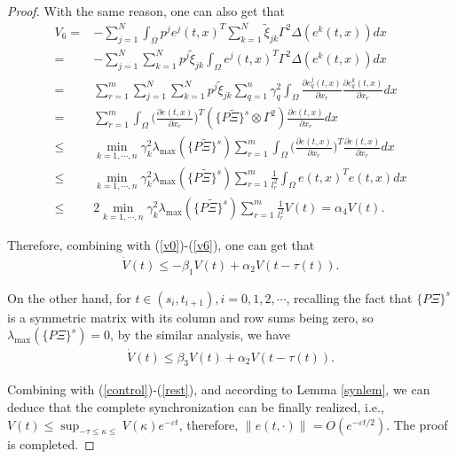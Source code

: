 \documentclass[review]{elsarticle}
\begin{document}
\begin{proof}
With the same reason, one can also get that
\begin{align}\label{v6}
V_6=&-\sum\limits_{j=1}^N\int_{\Omega}p^je^j(t,x)^T\sum\limits_{k=1}^N\tilde{\xi}_{jk}\Gamma^2
\Delta(e^k(t,x))dx\nonumber\\
=&-\sum\limits_{j=1}^N\sum\limits_{k=1}^Np^j\tilde{\xi}_{jk}\int_{\Omega}e^j(t,x)^T\Gamma^2
\Delta(e^k(t,x))dx\nonumber\\
=&\sum_{r=1}^m\sum\limits_{j=1}^N\sum\limits_{k=1}^Np^j\tilde{\xi}_{jk}\sum_{q=1}^n\gamma^2_{q}\int_{\Omega}\frac{\partial{e^j_q(t,x)}}{\partial{x_r}}
\frac{\partial{e^k_q(t,x)}}{\partial{x_r}}dx\nonumber\\
=&\sum_{r=1}^m\int_{\Omega}\bigg(\frac{\partial{e(t,x)}}{\partial{x_r}}\bigg)^T
(\{P\tilde{\Xi}\}^s\otimes \Gamma^2)\frac{\partial{e(t,x)}}{\partial{x_r}}dx\nonumber\\
\le&\min_{k=1,\cdots,n}\gamma_k^2\lambda_{\max}(\{P\tilde{\Xi}\}^s)\sum_{r=1}^m\int_{\Omega}\bigg(\frac{\partial{e(t,x)}}{\partial{x_r}}\bigg)^T
\frac{\partial{e(t,x)}}{\partial{x_r}}dx\nonumber\\
\le&\min_{k=1,\cdots,n}\gamma_k^2\lambda_{\max}(\{P\tilde{\Xi}\}^s)\sum_{r=1}^m\frac{1}{l_r^2}\int_{\Omega}e(t,x)^Te(t,x)dx\nonumber\\
\le&2\min_{k=1,\cdots,n}\gamma_k^2\lambda_{\max}(\{P\tilde{\Xi}\}^s)\sum_{r=1}^m\frac{1}{l_r^2}V(t)=\alpha_4V(t).
\end{align}

Therefore, combining with (\ref{v0})-(\ref{v6}), one can get that
\begin{align}\label{control}
\dot{V}(t)\leq -\beta_1V(t)+\alpha_2V(t-\tau(t)).
\end{align}

On the other hand, for $t\in (s_i,t_{i+1}), i=0,1,2,\cdots$, recalling the fact that $\{P\Xi\}^s$ is a symmetric matrix with its column and row sums being zero, so $\lambda_{\max}(\{P\Xi\}^s)=0$, by the similar analysis, we have
\begin{align}\label{rest}
\dot{V}(t)\leq \beta_3V(t)+\alpha_2V(t-\tau(t)).
\end{align}

Combining with (\ref{control})-(\ref{rest}), and according to Lemma \ref{synlem}, we can deduce that the complete synchronization can be finally realized, i.e.,
$V(t)\le \sup_{-\tau\le\kappa\le}V(\kappa)e^{-\varepsilon t}$, therefore, $\|e(t,\cdot)\|=O(e^{-\varepsilon t/2})$. The proof is completed.
\end{proof}
\end{document}
